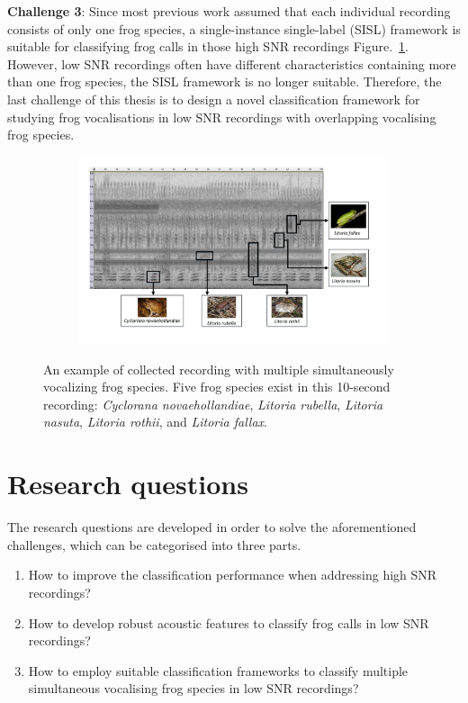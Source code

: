 \noindent \textbf{Challenge 3}: Since most previous work assumed that each individual recording consists of only one frog species, a single-instance single-label (SISL) framework is suitable for classifying frog calls in those high SNR recordings Figure.~\ref{fig:label}. However, low SNR recordings often have different characteristics containing more than one frog species, the SISL framework is no longer suitable. Therefore, the last challenge of this thesis is to design a novel classification framework for studying frog vocalisations in low SNR recordings with overlapping vocalising frog species. 


\begin{figure}[htb!]
\centering
    \begin{subfigure}[b]{\textwidth}
           \includegraphics[width=1\textwidth]{image/LR/label.pdf}
    \end{subfigure}%
\caption[An example of collected recording]{An example of collected recording with multiple simultaneously vocalizing frog species. Five frog species exist in this 10-second recording: \textit{Cyclorana novaehollandiae}, \textit{Litoria rubella}, \textit{Litoria nasuta}, \textit{Litoria rothii}, and \textit{Litoria fallax}.}
\label{fig:label}       
\end{figure}

\section{Research questions}
The research questions are developed in order to solve the aforementioned challenges, which can be categorised into three parts. 

\begin{enumerate}
 \item How to improve the classification performance when addressing high SNR recordings?
 
\item How to develop robust acoustic features to classify frog calls in low SNR recordings?

\item How to employ suitable classification frameworks to classify multiple simultaneous vocalising frog species in low SNR recordings?
 
\end{enumerate}




